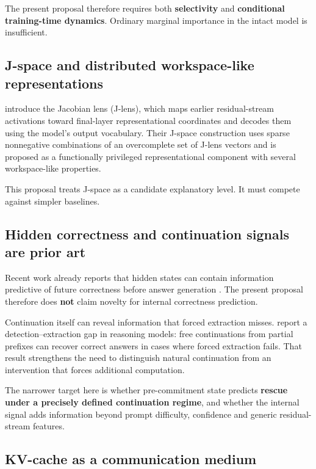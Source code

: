 The present proposal therefore requires both \textbf{selectivity} and \textbf{conditional training-time dynamics}. Ordinary marginal importance in the intact model is insufficient.

\subsection{J-space and distributed workspace-like representations}\label{j-space-and-distributed-workspace-like-representations}

\textcite{gurnee2026workspace} introduce the Jacobian lens (J-lens), which maps earlier residual-stream activations toward final-layer representational coordinates and decodes them using the model's output vocabulary. Their J-space construction uses sparse nonnegative combinations of an overcomplete set of J-lens vectors and is proposed as a functionally privileged representational component with several workspace-like properties.

This proposal treats J-space as a candidate explanatory level. It must compete against simpler baselines.

\subsection{Hidden correctness and continuation signals are prior art}\label{hidden-correctness-signals-are-prior-art}

Recent work already reports that hidden states can contain information predictive of future correctness before answer generation \autocite{cencerrado2025noanswer,luo2026missing,dicicco2026code}. The present proposal therefore does \textbf{not} claim novelty for internal correctness prediction.

Continuation itself can reveal information that forced extraction misses. \textcite{wang2026detection} report a detection--extraction gap in reasoning models: free continuations from partial prefixes can recover correct answers in cases where forced extraction fails. That result strengthens the need to distinguish natural continuation from an intervention that forces additional computation.

The narrower target here is whether pre-commitment state predicts \textbf{rescue under a precisely defined continuation regime}, and whether the internal signal adds information beyond prompt difficulty, confidence and generic residual-stream features.

\subsection{KV-cache as a communication medium}\label{kv-cache-communication}

